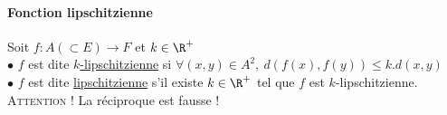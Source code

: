 		\paragraph{Fonction lipschitzienne}
			Soit $f:A(\subset E) \rightarrow F$ et $k\in \R^+$\\
			\hspace*{0.5cm} $\bullet $ $f$ est dite \underline{$k$-lipschitzienne} si $\forall (x,y) \in A^2 ,~d(f(x),f(y)) \leq k.d(x,y)$ \\
			\hspace*{0.5cm} $\bullet $ $f$ est dite \underline{lipschitzienne} s'il existe $k\in\R^+$ tel que $f$ est $k$-lipschitzienne. \trait
		 \\
		{\small \textsc{Attention !} La réciproque est fausse ! }
		\vspace*{0.5cm} \\ 
		\newpage \traitd

